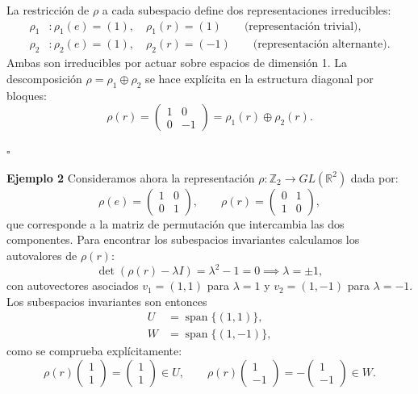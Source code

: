 \documentclass[a4paper,11pt]{book} %
\begin{document}
\noindent
La restricción de $\rho$ a cada subespacio define dos representaciones irreducibles:
\begin{align*}
    \rho_1 &: \rho_1(e) = (1),\quad \rho_1(r) = (1)
    \qquad \text{(representación trivial)}, \\
    \rho_2 &: \rho_2(e) = (1),\quad \rho_2(r) = (-1)
    \qquad \text{(representación alternante)}.
\end{align*}
\noindent
Ambas son irreducibles por actuar sobre espacios de dimensión 1. La descomposición
$\rho = \rho_1 \oplus \rho_2$ se hace explícita en la estructura diagonal por bloques:
\begin{equation}
    \rho(r) = \begin{pmatrix} 1 & 0 \\ 0 & -1 \end{pmatrix}
    = \rho_1(r) \oplus \rho_2(r).
\end{equation}
\begin{flushright}
    \(\square\)
\end{flushright}
\noindent
\textbf{Ejemplo 2} 
\medskip\newline\noindent
Consideramos ahora la representación
$\rho : \mathbb{Z}_2 \to GL(\mathbb{R}^2)$ dada por:
\begin{equation}
    \rho(e) = \begin{pmatrix} 1 & 0 \\ 0 & 1 \end{pmatrix}, \qquad
    \rho(r) = \begin{pmatrix} 0 & 1 \\ 1 & 0 \end{pmatrix},
\end{equation}
\noindent
que corresponde a la matriz de permutación que intercambia las dos componentes.
Para encontrar los subespacios invariantes calculamos los autovalores de $\rho(r)$:
\begin{equation}
    \det(\rho(r) - \lambda I) = \lambda^2 - 1 = 0 \implies \lambda = \pm 1,
\end{equation}
\noindent
con autovectores asociados $v_1 = (1,1)$ para $\lambda = 1$ y $v_2 = (1,-1)$
para $\lambda = -1$. Los subespacios invariantes son entonces
\begin{align*}
    U &= \operatorname{span}\{(1,1)\}, \\
    W &= \operatorname{span}\{(1,-1)\},
\end{align*}
como se comprueba explícitamente:
\begin{equation}
    \rho(r)\begin{pmatrix}1\\1\end{pmatrix} = \begin{pmatrix}1\\1\end{pmatrix} \in U,
    \qquad
    \rho(r)\begin{pmatrix}1\\-1\end{pmatrix} = -\begin{pmatrix}1\\-1\end{pmatrix} \in W.
\end{equation}
\end{document}

